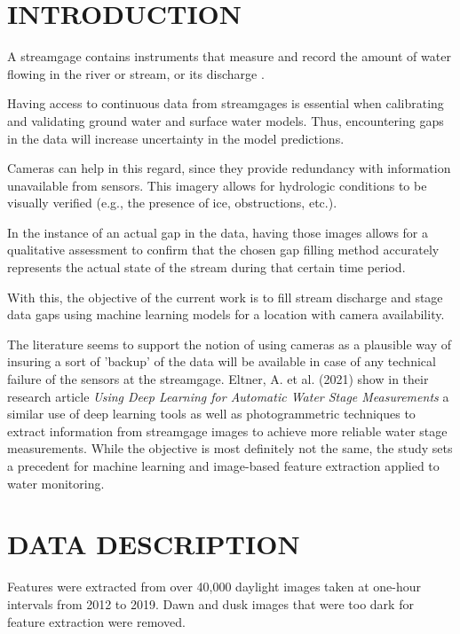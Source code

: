 \documentclass[conference]{IEEEtran}
\begin{document}

\section{INTRODUCTION}

A streamgage contains instruments that measure and record the amount of water flowing in the river or stream, or its discharge \cite{streamgage}.

Having access to continuous data from streamgages is essential when calibrating and validating ground water and surface water models. Thus, encountering gaps in the data will increase uncertainty in the model predictions.

Cameras can help in this regard, since they provide redundancy with information unavailable from sensors. This imagery allows for hydrologic conditions to be visually verified (e.g., the presence of ice, obstructions, etc.).

In the instance of an actual gap in the data, having those images allows for a qualitative assessment to confirm that the chosen gap filling method accurately represents the actual state of the stream during that certain time period.

With this, the objective of the current work is to fill stream discharge and stage data gaps using machine learning models for a location with camera availability.

The literature seems to support the notion of using cameras as a plausible way of insuring a sort of 'backup' of the data will be available in case of any technical failure of the sensors at the streamgage. Eltner, A. et al. (2021) show in their
research article \textit{Using Deep Learning for Automatic Water Stage Measurements} \cite{dl-waterstage} a similar use of deep learning tools as well as photogrammetric techniques to extract information from streamgage images to achieve more reliable water stage measurements. While the objective is most definitely not the same, the study sets a precedent for machine learning and image-based feature extraction applied to water monitoring.

\section{DATA DESCRIPTION}
Features were extracted from over 40,000 daylight images taken at one-hour intervals from 2012 to 2019. Dawn and dusk images that were too dark for feature extraction were removed.
\end{document}
